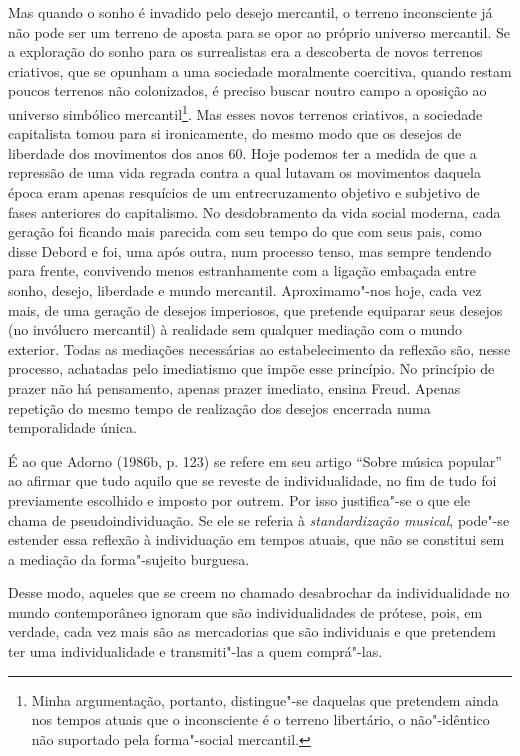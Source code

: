 Mas quando o sonho é invadido pelo desejo mercantil, o terreno
inconsciente já não pode ser um terreno de aposta para se opor ao
próprio universo mercantil. Se a exploração do sonho para os
surrealistas era a descoberta de novos terrenos criativos, que se
opunham a uma sociedade moralmente coercitiva, quando restam poucos
terrenos não colonizados, é preciso buscar noutro campo a oposição ao
universo simbólico mercantil\footnote{Minha argumentação, portanto,
  distingue"-se daquelas que pretendem ainda nos tempos atuais que o
  inconsciente é o terreno libertário, o não"-idêntico não suportado pela
  forma"-social mercantil.}. Mas esses novos terrenos criativos, a
sociedade capitalista tomou para si ironicamente, do mesmo modo que os
desejos de liberdade dos movimentos dos anos 60. Hoje podemos ter a
medida de que a repressão de uma vida regrada contra a qual lutavam os
movimentos daquela época eram apenas resquícios de um entrecruzamento
objetivo e subjetivo de fases anteriores do capitalismo. No
desdobramento da vida social moderna, cada geração foi ficando mais
parecida com seu tempo do que com seus pais, como disse Debord e
foi, uma após outra, num processo tenso, mas sempre tendendo para
frente, convivendo menos estranhamente com a ligação embaçada entre
sonho, desejo, liberdade e mundo mercantil. Aproximamo"-nos hoje, cada
vez mais, de uma geração de desejos imperiosos, que pretende equiparar
seus desejos (no invólucro mercantil) à realidade sem qualquer mediação
com o mundo exterior. Todas as mediações necessárias ao estabelecimento
da reflexão são, nesse processo, achatadas pelo imediatismo que impõe
esse princípio. No princípio de prazer não há pensamento, apenas prazer
imediato, ensina Freud. Apenas repetição do mesmo tempo de realização
dos desejos encerrada numa temporalidade única.

É ao que Adorno (1986b, p. 123) se refere em seu artigo ``Sobre música
popular'' ao afirmar que tudo aquilo que se reveste de individualidade,
no fim de tudo foi previamente escolhido e imposto por outrem. Por isso
justifica"-se o que ele chama de pseudoindividuação. Se ele se referia à
\emph{standardização musical}, pode"-se estender essa reflexão à
individuação em tempos atuais, que não se constitui sem a mediação da
forma"-sujeito burguesa.

Desse modo, aqueles que se creem no chamado desabrochar da
individualidade no mundo contemporâneo ignoram que são individualidades
de prótese, pois, em verdade, cada vez mais são as mercadorias que são
individuais e que pretendem ter uma individualidade e transmiti"-las a
quem comprá"-las.

